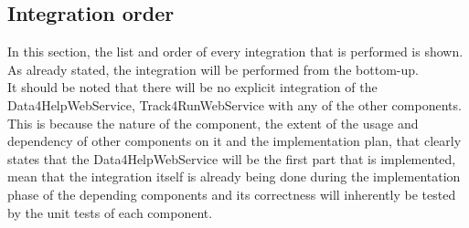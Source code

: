 \documentclass[a4paper, hidelinks, 12pt]{report}
\begin{document}
\subsection{Integration order}
In this section, the list and order of every integration that is performed is shown. As already stated, the integration will be performed from the bottom-up. \\

It should be noted that there will be no explicit integration of the Data4HelpWebService, Track4RunWebService with any of the other components. This is because the nature of the component, the extent of the usage and dependency of other components on it and the implementation plan, that clearly states that the Data4HelpWebService will be the first part that is implemented, mean that the integration itself is already being done during the implementation phase of the depending components and its correctness will inherently be tested by the unit tests of each component.
\end{document}
